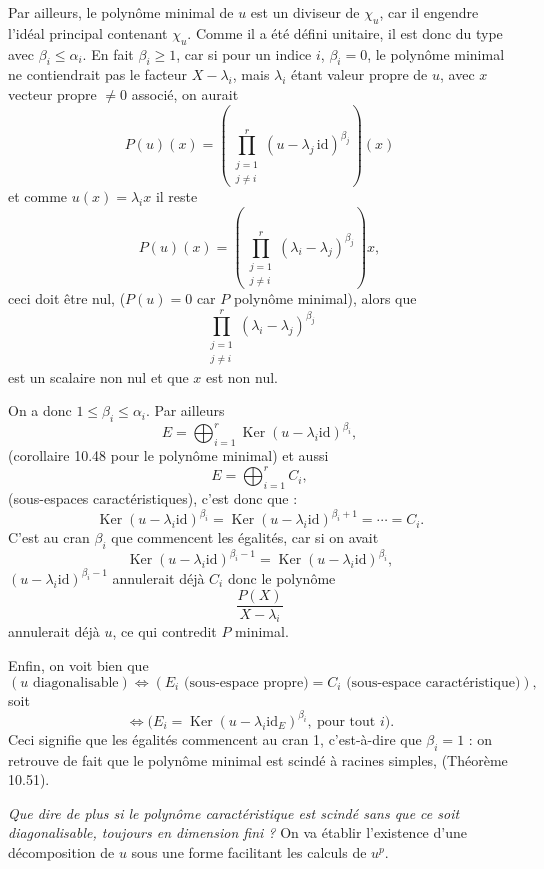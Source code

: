 Par ailleurs, le polynôme minimal de $u$ est un diviseur de $\chi_u$, car il engendre l'idéal principal contenant $\chi_u$. Comme il a été défini unitaire, il est donc du type
avec $\beta_i\le\alpha_i$. En fait $\beta_i\ge1$, car si pour un indice $i$, $\beta_i=0$, le polynôme minimal ne contiendrait pas le facteur $X-\lambda_i$, mais $\lambda_i$ étant valeur propre de $u$, avec $x$ vecteur propre $\ne0$ associé, on aurait
\[
P(u)(x)=\left(\prod_{\substack{j=1\\j\ne i}}^r(u-\lambda_j\,\mathrm{id})^{\beta_j}\right)(x)
\]
et comme $u(x)=\lambda_i x$ il reste
\[
P(u)(x)=\left(\prod_{\substack{j=1\\j\ne i}}^r(\lambda_i-\lambda_j)^{\beta_j}\right)x,
\]
ceci doit être nul, ($P(u)=0$ car $P$ polynôme minimal), alors que
\[
\prod_{\substack{j=1\\j\ne i}}^r(\lambda_i-\lambda_j)^{\beta_j}
\]
est un scalaire non nul et que $x$ est non nul.

On a donc $1\le\beta_i\le\alpha_i$. Par ailleurs
\[
E=\bigoplus_{i=1}^r\operatorname{Ker}(u-\lambda_i\mathrm{id})^{\beta_i},
\]
(corollaire 10.48 pour le polynôme minimal) et aussi
\[
E=\bigoplus_{i=1}^rC_i,
\]
(sous-espaces caractéristiques), c'est donc que :
\[
\operatorname{Ker}(u-\lambda_i\mathrm{id})^{\beta_i}
=\operatorname{Ker}(u-\lambda_i\mathrm{id})^{\beta_i+1}
=\cdots=C_i.
\]
C'est au cran $\beta_i$ que commencent les égalités, car si on avait
\[
\operatorname{Ker}(u-\lambda_i\mathrm{id})^{\beta_i-1}
=\operatorname{Ker}(u-\lambda_i\mathrm{id})^{\beta_i},
\]
$(u-\lambda_i\mathrm{id})^{\beta_i-1}$ annulerait déjà $C_i$ donc le polynôme
\[
\frac{P(X)}{X-\lambda_i}
\]
annulerait déjà $u$, ce qui contredit $P$ minimal.

Enfin, on voit bien que
\[
(u\text{ diagonalisable})\Longleftrightarrow
(E_i\text{ (sous-espace propre)}=C_i\text{ (sous-espace caractéristique)}),
\]
soit
\[
\Longleftrightarrow\bigl(E_i=\operatorname{Ker}(u-\lambda_i\mathrm{id}_E)^{\beta_i},\ \text{pour tout }i\bigr).
\]
Ceci signifie que les égalités commencent au cran 1, c'est-à-dire que $\beta_i=1$ : on retrouve de fait que le polynôme minimal est scindé à racines simples, (Théorème 10.51).

\medskip\noindent\textit{Que dire de plus si le polynôme caractéristique est scindé sans que ce soit diagonalisable, toujours en dimension fini ?} On va établir l'existence d'une décomposition de $u$ sous une forme facilitant les calculs de $u^p$.

